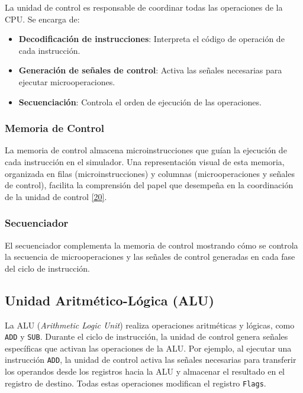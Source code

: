 \documentclass[12pt,oneside]{templates/unerthesis}
\providecommand{\tightlist}{%
  \setlength{\itemsep}{0pt}\setlength{\parskip}{0pt}}
\begin{document}
La unidad de control es responsable de coordinar todas las operaciones de la CPU. Se encarga de:

\begin{itemize}
\tightlist
\item
  \textbf{Decodificación de instrucciones}: Interpreta el código de operación de cada instrucción.
\item
  \textbf{Generación de señales de control}: Activa las señales necesarias para ejecutar microoperaciones.
\item
  \textbf{Secuenciación}: Controla el orden de ejecución de las operaciones.
\end{itemize}

\hypertarget{memoria-de-control}{%
\subsubsection{Memoria de Control}\label{memoria-de-control}}

La memoria de control almacena microinstrucciones que guían la ejecución de cada instrucción en el simulador. Una representación visual de esta memoria, organizada en filas (microinstrucciones) y columnas (microoperaciones y señales de control), facilita la comprensión del papel que desempeña en la coordinación de la unidad de control \protect\hyperlink{ref-stallings_computer_2021}{{[}20{]}}.

\hypertarget{secuenciador}{%
\subsubsection{Secuenciador}\label{secuenciador}}

El secuenciador complementa la memoria de control mostrando cómo se controla la secuencia de microoperaciones y las señales de control generadas en cada fase del ciclo de instrucción.

\hypertarget{unidad-aritmuxe9tico-luxf3gica-alu}{%
\subsection{Unidad Aritmético-Lógica (ALU)}\label{unidad-aritmuxe9tico-luxf3gica-alu}}

La ALU (\emph{Arithmetic Logic Unit}) realiza operaciones aritméticas y lógicas, como \texttt{ADD} y \texttt{SUB}. Durante el ciclo de instrucción, la unidad de control genera señales específicas que activan las operaciones de la ALU. Por ejemplo, al ejecutar una instrucción \texttt{ADD}, la unidad de control activa las señales necesarias para transferir los operandos desde los registros hacia la ALU y almacenar el resultado en el registro de destino. Todas estas operaciones modifican el registro \texttt{Flags}.
\end{document}
